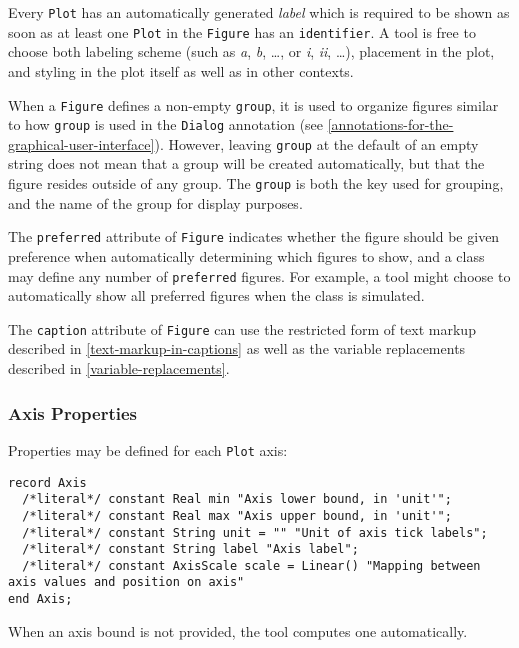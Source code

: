 Every \lstinline!Plot! has an automatically generated \emph{label} which is required to be shown as soon as at least one \lstinline!Plot! in the \lstinline!Figure! has an \lstinline!identifier!.
A tool is free to choose both labeling scheme (such as \emph{a}, \emph{b}, \dots, or \emph{i}, \emph{ii}, \dots), placement in the plot, and styling in the plot itself as well as in other contexts.

When a \lstinline!Figure! defines a non-empty \lstinline!group!, it is used to organize figures similar to how \lstinline!group! is used in the \lstinline!Dialog! annotation (see \cref{annotations-for-the-graphical-user-interface}).
However, leaving \lstinline!group! at the default of an empty string does not mean that a group will be created automatically, but that the figure resides outside of any group.
The \lstinline!group! is both the key used for grouping, and the name of the group for display purposes.

The \lstinline!preferred! attribute of \lstinline!Figure! indicates whether the figure should be given preference when automatically determining which figures to show, and a class may define any number of \lstinline!preferred! figures.
For example, a tool might choose to automatically show all preferred figures when the class is simulated.

The \lstinline!caption! attribute of \lstinline!Figure! can use the restricted form of text markup described in \cref{text-markup-in-captions} as well as the variable replacements described in \cref{variable-replacements}.

\subsubsection{Axis Properties}\label{axis-properties}

Properties may be defined for each \lstinline!Plot! axis:
\begin{lstlisting}[language=modelica]
record Axis
  /*literal*/ constant Real min "Axis lower bound, in 'unit'";
  /*literal*/ constant Real max "Axis upper bound, in 'unit'";
  /*literal*/ constant String unit = "" "Unit of axis tick labels";
  /*literal*/ constant String label "Axis label";
  /*literal*/ constant AxisScale scale = Linear() "Mapping between axis values and position on axis"
end Axis;
\end{lstlisting}

When an axis bound is not provided, the tool computes one automatically.

